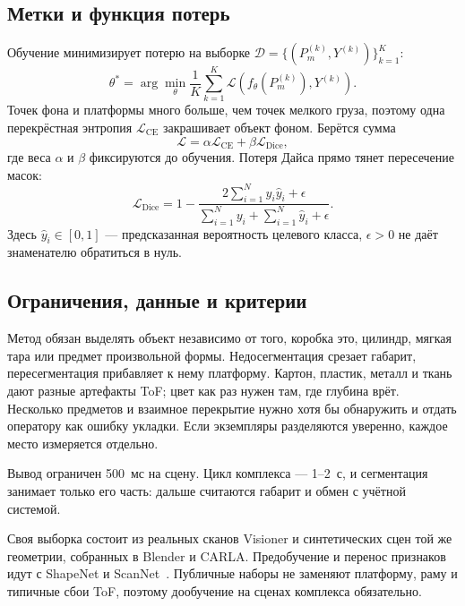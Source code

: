 \documentclass{misisarticle}
\begin{document}
\subsection{Метки и функция потерь}

Обучение минимизирует потерю на выборке $\mathcal{D} = \{(P_m^{(k)}, Y^{(k)})\}_{k=1}^{K}$:
\begin{equation}
\theta^{*}
=
\arg\min_{\theta}
\frac{1}{K}
\sum_{k=1}^{K}
\mathcal{L}\!\left(f_{\theta}(P_m^{(k)}), Y^{(k)}\right).
\label{eq:train}
\end{equation}
Точек фона и платформы много больше, чем точек мелкого груза, поэтому одна перекрёстная энтропия $\mathcal{L}_{\mathrm{CE}}$ закрашивает объект фоном. Берётся сумма
\begin{equation}
\mathcal{L}
=
\alpha \mathcal{L}_{\mathrm{CE}}
+
\beta \mathcal{L}_{\mathrm{Dice}},
\label{eq:loss}
\end{equation}
где веса $\alpha$ и $\beta$ фиксируются до обучения. Потеря Дайса прямо тянет пересечение масок:
\begin{equation}
\mathcal{L}_{\mathrm{Dice}}
=
1 -
\frac{2\sum_{i=1}^{N} y_i \hat{y}_i + \epsilon}
{\sum_{i=1}^{N} y_i + \sum_{i=1}^{N} \hat{y}_i + \epsilon}.
\label{eq:dice}
\end{equation}
Здесь $\hat{y}_i \in [0,1]$ --- предсказанная вероятность целевого класса, $\epsilon > 0$ не даёт знаменателю обратиться в нуль.

\subsection{Ограничения, данные и критерии}

Метод обязан выделять объект независимо от того, коробка это, цилиндр, мягкая тара или предмет произвольной формы. Недосегментация срезает габарит, пересегментация прибавляет к нему платформу. Картон, пластик, металл и ткань дают разные артефакты ToF; цвет как раз нужен там, где глубина врёт. Несколько предметов и взаимное перекрытие нужно хотя бы обнаружить и отдать оператору как ошибку укладки. Если экземпляры разделяются уверенно, каждое место измеряется отдельно.

Вывод ограничен 500~мс на сцену. Цикл комплекса --- 1--2~с, и сегментация занимает только его часть: дальше считаются габарит и обмен с учётной системой.

Своя выборка состоит из реальных сканов Visioner и синтетических сцен той же геометрии, собранных в Blender и CARLA. Предобучение и перенос признаков идут с ShapeNet и ScanNet~\cite{shapenet,scannet}. Публичные наборы не заменяют платформу, раму и типичные сбои ToF, поэтому дообучение на сценах комплекса обязательно.
\end{document}
